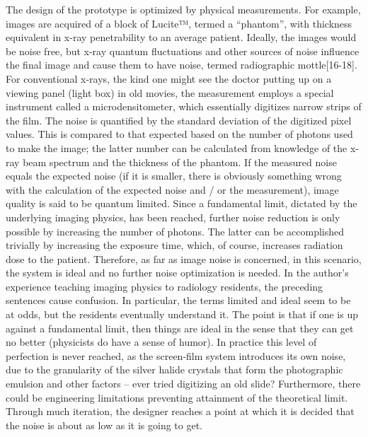 \documentclass[
]{book}
\begin{document}
The design of the prototype is optimized by physical measurements. For example, images are acquired of a block of Lucite™, termed a ``phantom'', with thickness equivalent in x-ray penetrability to an average patient. Ideally, the images would be noise free, but x-ray quantum fluctuations and other sources of noise influence the final image and cause them to have noise, termed radiographic mottle{[}16-18{]}. For conventional x-rays, the kind one might see the doctor putting up on a viewing panel (light box) in old movies, the measurement employs a special instrument called a microdensitometer, which essentially digitizes narrow strips of the film. The noise is quantified by the standard deviation of the digitized pixel values. This is compared to that expected based on the number of photons used to make the image; the latter number can be calculated from knowledge of the x-ray beam spectrum and the thickness of the phantom. If the measured noise equals the expected noise (if it is smaller, there is obviously something wrong with the calculation of the expected noise and / or the measurement), image quality is said to be quantum limited. Since a fundamental limit, dictated by the underlying imaging physics, has been reached, further noise reduction is only possible by increasing the number of photons. The latter can be accomplished trivially by increasing the exposure time, which, of course, increases radiation dose to the patient. Therefore, as far as image noise is concerned, in this scenario, the system is ideal and no further noise optimization is needed. In the author's experience teaching imaging physics to radiology residents, the preceding sentences cause confusion. In particular, the terms limited and ideal seem to be at odds, but the residents eventually understand it. The point is that if one is up against a fundamental limit, then things are ideal in the sense that they can get no better (physicists do have a sense of humor). In practice this level of perfection is never reached, as the screen-film system introduces its own noise, due to the granularity of the silver halide crystals that form the photographic emulsion and other factors -- ever tried digitizing an old slide? Furthermore, there could be engineering limitations preventing attainment of the theoretical limit. Through much iteration, the designer reaches a point at which it is decided that the noise is about as low as it is going to get.
\end{document}

